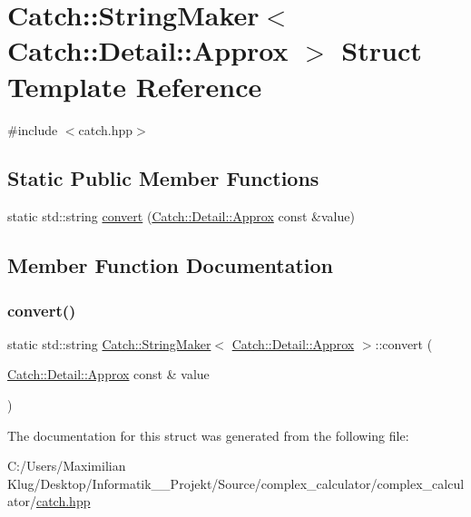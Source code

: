 \hypertarget{struct_catch_1_1_string_maker_3_01_catch_1_1_detail_1_1_approx_01_4}{}\section{Catch\+:\+:String\+Maker$<$ Catch\+:\+:Detail\+:\+:Approx $>$ Struct Template Reference}
\label{struct_catch_1_1_string_maker_3_01_catch_1_1_detail_1_1_approx_01_4}


{\ttfamily \#include $<$catch.\+hpp$>$}

\subsection*{Static Public Member Functions}
\begin{DoxyCompactItemize}
\item 
static std\+::string \mbox{\hyperlink{struct_catch_1_1_string_maker_3_01_catch_1_1_detail_1_1_approx_01_4_a8e5015720682fecfbff0f05de19a698f}{convert}} (\mbox{\hyperlink{class_catch_1_1_detail_1_1_approx}{Catch\+::\+Detail\+::\+Approx}} const \&value)
\end{DoxyCompactItemize}


\subsection{Member Function Documentation}
\mbox{\label{struct_catch_1_1_string_maker_3_01_catch_1_1_detail_1_1_approx_01_4_a8e5015720682fecfbff0f05de19a698f}} 
\subsubsection{\texorpdfstring{convert()}{convert()}}
{\footnotesize\ttfamily static std\+::string \mbox{\hyperlink{struct_catch_1_1_string_maker}{Catch\+::\+String\+Maker}}$<$ \mbox{\hyperlink{class_catch_1_1_detail_1_1_approx}{Catch\+::\+Detail\+::\+Approx}} $>$\+::convert (\begin{DoxyParamCaption}\item[{\mbox{\hyperlink{class_catch_1_1_detail_1_1_approx}{Catch\+::\+Detail\+::\+Approx}} const \&}]{value }\end{DoxyParamCaption})\hspace{0.3cm}{\ttfamily [static]}}



The documentation for this struct was generated from the following file\+:\begin{DoxyCompactItemize}
\item 
C\+:/\+Users/\+Maximilian Klug/\+Desktop/\+Informatik\+\_\+\_\+\+Projekt/\+Source/complex\+\_\+calculator/complex\+\_\+calculator/\mbox{\hyperlink{catch_8hpp}{catch.\+hpp}}\end{DoxyCompactItemize}
